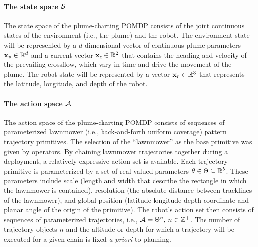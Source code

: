 \paragraph{The state space $\mathcal{S}$} The state space of the plume-charting POMDP consists of the joint continuous states of the environment (i.e., the plume) and the robot. The environment state will be represented by a $d$-dimensional vector of continuous plume parameters $\mathbf{x}_p \in \mathbb{R}^d$ and a current vector $\mathbf{x}_c \in \mathbb{R}^2$ that contains the heading and velocity of the prevailing crossflow, which vary in time and drive the movement of the plume. The robot state will be represented by a vector $\mathbf{x}_r \in \mathbb{R}^3$ that represents the latitude, longitude, and depth of the robot.

\paragraph{The action space $\mathcal{A}$} The action space of the plume-charting POMDP consists of sequences of parameterized lawnmower (i.e., back-and-forth uniform coverage)  pattern trajectory primitives. The selection of the ``lawnmower'' as the base primitive was given by \Sentry operators. By chaining lawnmower trajectories together during a deployment, a relatively expressive action set is available. Each trajectory primitive is parameterized by a set of real-valued parameters $\theta \in \Theta \subseteq \mathbb{R}^b$. These parameters include scale (length and width that describe the rectangle in which the lawnmower is contained), resolution (the absolute distance between tracklines of the lawnmower), and global position (latitude-longitude-depth coordinate and planar angle of the origin of the primitive). The robot's action set then consists of sequences of parameterized trajectories, i.e., $\mathcal{A} = \Theta^n, \, n \in \mathbb{Z}^+$. The number of trajectory objects $n$ and the altitude or depth for which a trajectory will be executed for a given chain is fixed \emph{a priori} to planning. 

